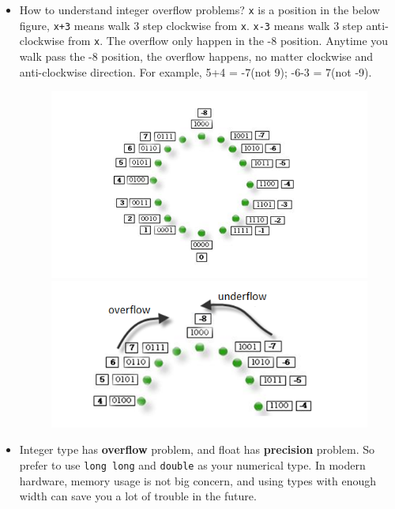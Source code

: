 \documentclass[a4paper,11pt,twoside]{book}
\begin{document}
\begin{itemize}
	\item How to understand integer overflow problems? \texttt{x} is a position in the below figure, \texttt{x+3} means walk 3 step clockwise from \texttt{x}. \texttt{x-3} means walk 3 step anti-clockwise from \texttt{x}. The overflow only happen in the -8 position. Anytime you walk pass the -8 position, the overflow happens, no matter clockwise and anti-clockwise direction. For example, 5+4 = -7(not 9); -6-3 = 7(not -9).

	
\begin{figure}[!htb]
	\begin{minipage}{0.48\textwidth}
		\centering
		\includegraphics[width=.9\linewidth]{pics/integer.png}
	\end{minipage}\hfill
	\begin{minipage}{0.48\textwidth}
		\centering
		\includegraphics[width=.9\linewidth]{pics/integer1.png}
	\end{minipage}
\end{figure}



	
	\item Integer type has \textbf{overflow} problem, and float has \textbf{precision} problem. So prefer to use \texttt{long long} and \texttt{double} as your numerical type. In modern hardware, memory usage is not big concern, and using types with enough width can save you a lot of trouble in the future. 
	

\end{itemize}
\end{document}

